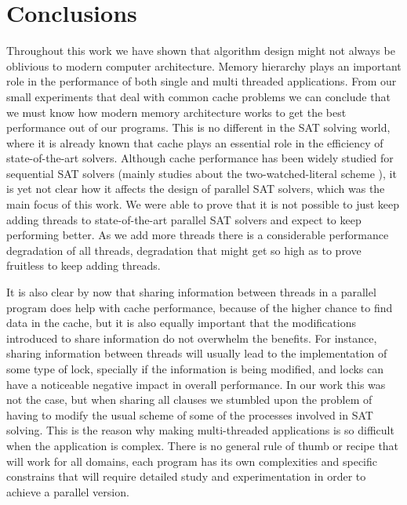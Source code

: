 \documentclass[12pt]{diicc}
\begin{document}
%
% 
\chapter{Conclusions}\label{chap:conclusion}

Throughout this work we have shown that algorithm design might not always be oblivious to modern computer architecture. Memory hierarchy plays an important role in the performance of both single and multi threaded applications. From our small experiments that deal with common cache problems we can conclude that we must know how modern memory architecture works to get the best performance out of our programs. This is no different in the SAT solving world, where it is already known that cache plays an essential role in the efficiency of state-of-the-art solvers. Although cache performance has been widely studied for sequential SAT solvers (mainly studies about the two-watched-literal scheme \cite{chaff}), it is yet not clear how it affects the design of parallel SAT solvers, which was the main focus of this work. We were able to prove that it is not possible to just keep adding threads to state-of-the-art parallel SAT solvers and expect to keep performing better. As we add more threads there is a considerable performance degradation of all threads, degradation that might get so high as to prove fruitless to keep adding threads.

It is also clear by now that sharing information between threads in a parallel program does help with cache performance, because of the higher chance to find data in the cache, but it is also equally important that the modifications introduced to share information do not overwhelm the benefits. For instance, sharing information between threads will usually lead to the implementation of some type of lock, specially if the information is being modified, and locks can have a noticeable negative impact in overall performance. In our work this was not the case, but when sharing all clauses we stumbled upon the problem of having to modify the usual scheme of some of the processes involved in SAT solving. This is the reason why making multi-threaded applications is so difficult when the application is complex. There is no general rule of thumb or recipe that will work for all domains, each program has its own complexities and specific constrains that will require detailed study and experimentation in order to achieve a parallel version. 
\end{document}
